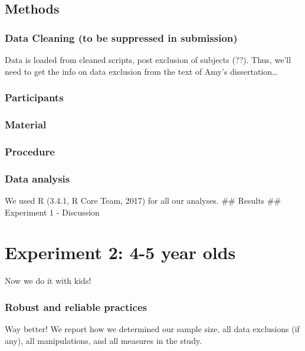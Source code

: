\documentclass[english,man]{apa6}
\theoremstyle{definition}
\theoremstyle{definition}
\theoremstyle{remark}
\begin{document}
\subsection{Methods}\label{methods}

\subsubsection{Data Cleaning (to be suppressed in
submission)}\label{data-cleaning-to-be-suppressed-in-submission}

Data is loaded from cleaned scripts, post exclusion of subjects (??).
Thus, we'll need to get the info on data exclusion from the text of
Amy's dissertation\ldots{}

\subsubsection{Participants}\label{participants}

\subsubsection{Material}\label{material}

\subsubsection{Procedure}\label{procedure}

\subsubsection{Data analysis}\label{data-analysis}

We used R (3.4.1, R Core Team, 2017) for all our analyses. \#\# Results
\#\# Experiment 1 - Discussion

\section{Experiment 2: 4-5 year olds}\label{experiment-2-4-5-year-olds}

Now we do it with kids!

\subsubsection{Robust and reliable
practices}\label{robust-and-reliable-practices-1}

Way better! We report how we determined our sample size, all data
exclusions (if any), all manipulations, and all measures in the study.
\end{document}
